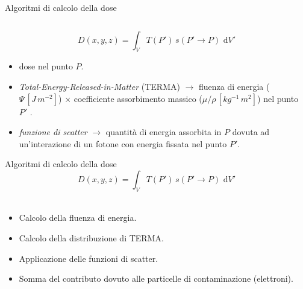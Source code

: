 \documentclass{beamer}
\newcommand{\de}{\,\textrm{d}}
\begin{document}
\begin{frame}{Algoritmi di calcolo della dose}
\begin{columns}
\end{columns}
\vspace{.5cm}
\small $$D(x,y,z) = \int_V T(P')\,s(P'\rightarrow P)\, \de V'$$
\begin{itemize}
\scriptsize
\item {} dose nel punto $P$.
\item {} \textit{Total-Energy-Released-in-Matter} (TERMA) $\rightarrow$ fluenza di energia ($\Psi\, [J\, m^{-2}]$) $\times$ coefficiente assorbimento massico ($\mu/\rho\,[kg^{-1}\, m^{2}]$) nel punto $P'$ .
\item {} \textit{funzione di scatter} $\rightarrow$ quantità di energia assorbita in $P$ dovuta ad un'interazione di un fotone con energia fissata nel punto $P'$.
\end{itemize}
\end{frame}


\begin{frame}{Algoritmi di calcolo della dose}
\small $$D(x,y,z) = \int_V T(P')\,s(P'\rightarrow P)\, \de V'$$\\ \vspace{.5cm}
\begin{itemize}
\footnotesize
\item Calcolo della fluenza di energia.
\item Calcolo della distribuzione di TERMA.
\item Applicazione delle funzioni di scatter.
\item Somma del contributo dovuto alle particelle di contaminazione (elettroni).
\end{itemize}

\end{frame}
\end{document}
